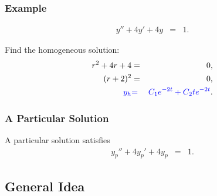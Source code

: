 \begin{frame}
  \frametitle{Example}

  \begin{eqnarray*}
    y'' + 4y' + 4y & = & 1.
  \end{eqnarray*}

  {
    Find the homogeneous solution:
      \begin{eqnarray*}
        r^2 + 4r + 4 & = & 0, \\
        (r+2)^2 & = & 0, \\
        {\color{blue}y_h} & {\color{blue}=} & {\color{blue}C_1 e^{-2t} + C_2 t e^{-2t}}.
      \end{eqnarray*}
    }

\end{frame}


\begin{frame}
  \frametitle{A Particular Solution}

  A particular solution satisfies
  \begin{eqnarray*}
    y_p'' + 4y_p' + 4y_p & = & 1.
  \end{eqnarray*}




\end{frame}

\subsection{General Idea}

